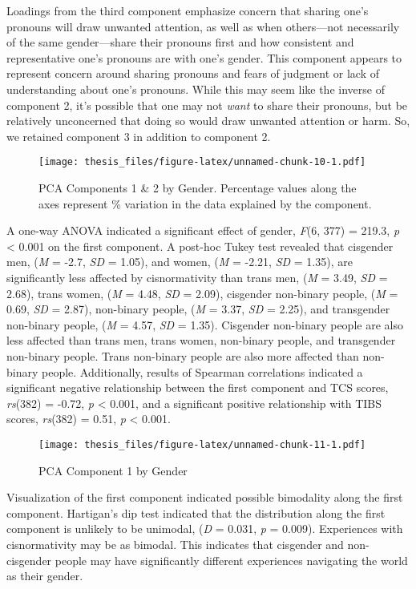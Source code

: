 \documentclass[12pt,twoside]{reedthesis}
\begin{document}
Loadings from the third component emphasize concern that sharing one's pronouns will draw unwanted attention, as well as when others---not necessarily of the same gender---share their pronouns first and how consistent and representative one's pronouns are with one's gender. This component appears to represent concern around sharing pronouns and fears of judgment or lack of understanding about one's pronouns. While this may seem like the inverse of component 2, it's possible that one may not \emph{want} to share their pronouns, but be relatively unconcerned that doing so would draw unwanted attention or harm. So, we retained component 3 in addition to component 2.
\begin{figure}
\centering
\texttt{[image: thesis\_files/figure-latex/unnamed-chunk-10-1.pdf]}
\caption{\label{fig:unnamed-chunk-10}PCA Components 1 \& 2 by Gender. Percentage values along the axes represent \% variation in the data explained by the component.}
\end{figure}
A one-way ANOVA indicated a significant effect of gender, \emph{F}(6, 377) = 219.3, \emph{p} \textless{} 0.001 on the first component. A post-hoc Tukey test revealed that cisgender men, (\emph{M} = -2.7, \emph{SD} = 1.05), and women, (\emph{M} = -2.21, \emph{SD} = 1.35), are significantly less affected by cisnormativity than trans men, (\emph{M} = 3.49, \emph{SD} = 2.68), trans women, (\emph{M} = 4.48, \emph{SD} = 2.09), cisgender non-binary people, (\emph{M} = 0.69, \emph{SD} = 2.87), non-binary people, (\emph{M} = 3.37, \emph{SD} = 2.25), and transgender non-binary people, (\emph{M} = 4.57, \emph{SD} = 1.35). Cisgender non-binary people are also less affected than trans men, trans women, non-binary people, and transgender non-binary people. Trans non-binary people are also more affected than non-binary people. Additionally, results of Spearman correlations indicated a significant negative relationship between the first component and TCS scores, \emph{rs}(382) = -0.72, \emph{p} \textless{} 0.001, and a significant positive relationship with TIBS scores, \emph{rs}(382) = 0.51, \emph{p} \textless{} 0.001.
\begin{figure}
\centering
\texttt{[image: thesis\_files/figure-latex/unnamed-chunk-11-1.pdf]}
\caption{\label{fig:unnamed-chunk-11}PCA Component 1 by Gender}
\end{figure}
Visualization of the first component indicated possible bimodality along the first component. Hartigan's dip test indicated that the distribution along the first component is unlikely to be unimodal, (\emph{D} = 0.031, \emph{p} = 0.009). Experiences with cisnormativity may be as bimodal. This indicates that cisgender and non-cisgender people may have significantly different experiences navigating the world as their gender.
\end{document}
